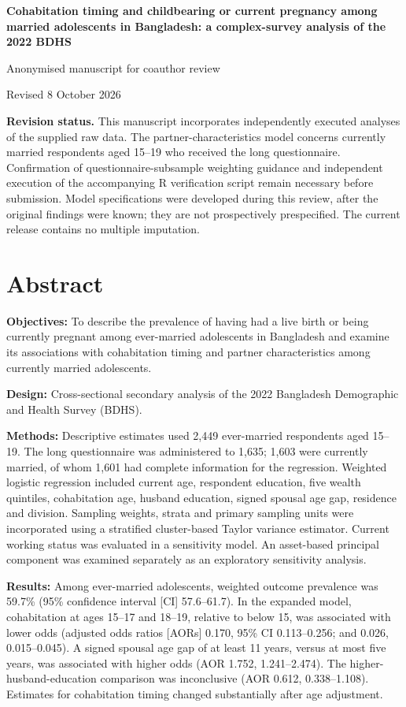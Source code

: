 \documentclass[11pt]{article}
\begin{document}
\begin{center}
{\Large\bfseries Cohabitation timing and childbearing or current pregnancy among married adolescents in Bangladesh: a complex-survey analysis of the 2022 BDHS}\par
\vspace{5mm}
{\small Anonymised manuscript for coauthor review}\par
{\small Revised 8 October 2026}
\end{center}
\textbf{Revision status.} This manuscript incorporates independently executed analyses of the supplied raw data. The partner-characteristics model concerns currently married respondents aged 15--19 who received the long questionnaire. Confirmation of questionnaire-subsample weighting guidance and independent execution of the accompanying R verification script remain necessary before submission. Model specifications were developed during this review, after the original findings were known; they are not prospectively prespecified. The current release contains no multiple imputation.

\section*{Abstract}
\textbf{Objectives:} To describe the prevalence of having had a live birth or being currently pregnant among ever-married adolescents in Bangladesh and examine its associations with cohabitation timing and partner characteristics among currently married adolescents.

\textbf{Design:} Cross-sectional secondary analysis of the 2022 Bangladesh Demographic and Health Survey (BDHS).

\textbf{Methods:} Descriptive estimates used 2,449 ever-married respondents aged 15--19. The long questionnaire was administered to 1,635; 1,603 were currently married, of whom 1,601 had complete information for the regression. Weighted logistic regression included current age, respondent education, five wealth quintiles, cohabitation age, husband education, signed spousal age gap, residence and division. Sampling weights, strata and primary sampling units were incorporated using a stratified cluster-based Taylor variance estimator. Current working status was evaluated in a sensitivity model. An asset-based principal component was examined separately as an exploratory sensitivity analysis.

\textbf{Results:} Among ever-married adolescents, weighted outcome prevalence was 59.7\% (95\% confidence interval [CI] 57.6--61.7). In the expanded model, cohabitation at ages 15--17 and 18--19, relative to below 15, was associated with lower odds (adjusted odds ratios [AORs] 0.170, 95\% CI 0.113--0.256; and 0.026, 0.015--0.045). A signed spousal age gap of at least 11 years, versus at most five years, was associated with higher odds (AOR 1.752, 1.241--2.474). The higher-husband-education comparison was inconclusive (AOR 0.612, 0.338--1.108). Estimates for cohabitation timing changed substantially after age adjustment.
\end{document}
